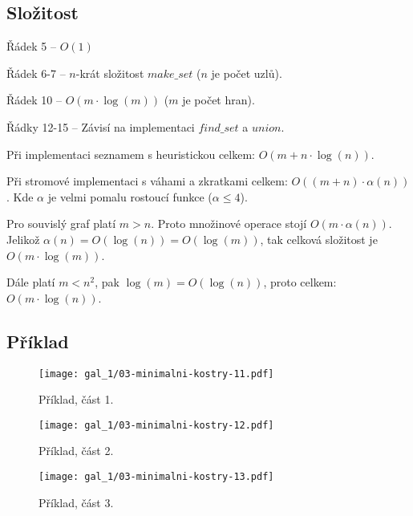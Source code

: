 \subsection*{Složitost}

\begin{compactitem}
    \item Řádek 5 -- $O(1)$
    \item Řádek 6-7 -- $n$-krát složitost $make\_set$ ($n$ je počet uzlů).
    \item Řádek 10 -- $O(m \cdot \log(m))$ ($m$ je počet hran).
    \item Řádky 12-15 -- Závisí na implementaci $find\_set$ a $union$.
    \begin{compactitem}
        \item Při implementaci seznamem s heuristickou celkem: $O(m + n \cdot \log(n))$.
        \item Při stromové implementaci s váhami a zkratkami celkem: $O((m+n) \cdot \alpha(n))$. Kde $\alpha$ je velmi pomalu rostoucí funkce ($\alpha \leq 4$).
    \end{compactitem}
    \item Pro souvislý graf platí $m > n$. Proto množinové operace stojí $O(m \cdot \alpha(n))$. Jelikož $\alpha(n) = O(\log(n)) = O(\log(m))$, tak celková složitost je $O(m \cdot \log(m))$.
    \item Dále platí $m < n^2$, pak $\log(m) = O(\log(n))$, proto celkem: $O(m \cdot \log(n))$.
\end{compactitem}

\subsection*{Příklad}

\begin{figure}[H]
    \centering
    \texttt{[image: gal\_1/03-minimalni-kostry-11.pdf]}
    \caption{Příklad, část 1.}
\end{figure}

\begin{figure}[H]
    \centering
    \texttt{[image: gal\_1/03-minimalni-kostry-12.pdf]}
    \caption{Příklad, část 2.}
\end{figure}

\begin{figure}[H]
    \centering
    \texttt{[image: gal\_1/03-minimalni-kostry-13.pdf]}
    \caption{Příklad, část 3.}
\end{figure}

